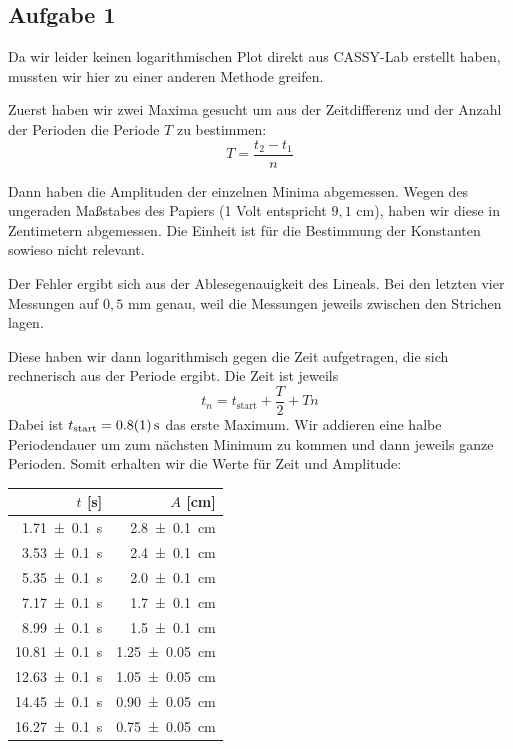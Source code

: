 \documentclass[a4paper,german,12pt,smallheadings]{scrartcl}
\begin{document}
\subsection{Aufgabe 1}
Da wir leider keinen logarithmischen Plot direkt aus CASSY-Lab erstellt haben,
mussten wir hier zu einer anderen Methode greifen.

Zuerst haben wir zwei Maxima gesucht um aus der Zeitdifferenz und der Anzahl
der Perioden die Periode $T$ zu bestimmen:
\begin{equation}
  T = \frac{t_2 - t_1}{n}
\end{equation}

Dann haben die Amplituden der einzelnen Minima abgemessen.
Wegen des ungeraden Maßstabes des Papiers (1 Volt entspricht $9{,}1$
cm), haben wir diese in Zentimetern abgemessen. Die Einheit ist für die
Bestimmung der Konstanten sowieso nicht relevant.

Der Fehler ergibt sich aus der Ablesegenauigkeit des Lineals. Bei den letzten
vier Messungen auf $0{,}5$ mm genau, weil die Messungen jeweils zwischen
den Strichen lagen.

Diese haben wir dann logarithmisch gegen die Zeit aufgetragen, die sich
rechnerisch aus der Periode ergibt. Die Zeit ist jeweils
\begin{equation}
  t_n = t_\text{start} + \frac{T}{2} + Tn
\end{equation}
Dabei ist $t_\text{start} = \SI{0.8+-0.1}{s}$ das erste Maximum. Wir addieren
eine halbe Periodendauer um zum nächsten Minimum zu kommen und dann jeweils
ganze Perioden. Somit erhalten wir die Werte für Zeit und Amplitude:

\begin{tabular}{r|r}
  $t$ [s] & $A$ [cm] \\
  \hline
  \SI{ 1.71+-0.1}{s} & \SI{ 2.8+-0.1 }{cm} \\
  \SI{ 3.53+-0.1}{s} & \SI{ 2.4+-0.1 }{cm} \\
  \SI{ 5.35+-0.1}{s} & \SI{ 2,0+-0.1 }{cm} \\
  \SI{ 7.17+-0.1}{s} & \SI{ 1.7+-0.1 }{cm} \\
  \SI{ 8.99+-0.1}{s} & \SI{ 1.5+-0.1 }{cm} \\
  \SI{10.81+-0.1}{s} & \SI{1.25+-0.05}{cm} \\
  \SI{12.63+-0.1}{s} & \SI{1.05+-0.05}{cm} \\
  \SI{14.45+-0.1}{s} & \SI{0.90+-0.05}{cm} \\
  \SI{16.27+-0.1}{s} & \SI{0.75+-0.05}{cm} \\
\end{tabular}
\end{document}
